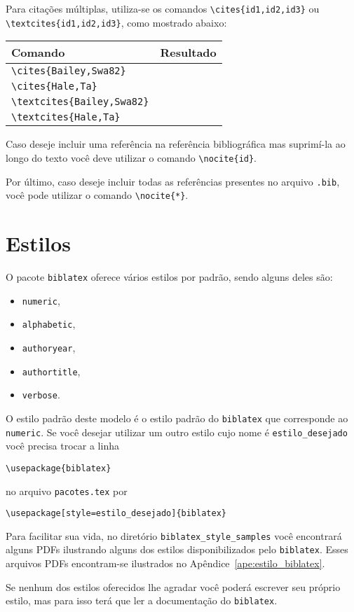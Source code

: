 Para citações múltiplas, utiliza-se os comandos \lstinline+\cites{id1,id2,id3}+
ou \lstinline+\textcites{id1,id2,id3}+, como mostrado abaixo:
\begin{table}[!h]
  \centering
  \begin{tabular}{lc}
    \toprule
    Comando & Resultado \\ \midrule
    \lstinline+\cites{Bailey,Swa82}+ & \cites{Bailey,Swa82} \\
    \lstinline+\cites{Hale,Ta}+ & \cites{Hale,Ta} \\
    \lstinline+\textcites{Bailey,Swa82}+ & \textcites{Bailey,Swa82} \\
    \lstinline+\textcites{Hale,Ta}+ & \textcites{Hale,Ta} \\ \bottomrule
  \end{tabular}
\end{table}

Caso deseje incluir uma referência na referência bibliográfica mas
suprimí-la ao longo do texto você deve utilizar o comando
\lstinline+\nocite{id}+.

Por último, caso deseje incluir todas as referências presentes no arquivo
\lstinline+.bib+, você pode utilizar o comando \lstinline+\nocite{*}+.\nocite{*}

\section{Estilos}
O pacote \lstinline+biblatex+ oferece vários estilos por padrão, sendo alguns
deles são:
\begin{itemize}
  \item \lstinline+numeric+,
  \item \lstinline+alphabetic+,
  \item \lstinline+authoryear+,
  \item \lstinline+authortitle+,
  \item \lstinline+verbose+.
\end{itemize}

O estilo padrão deste modelo é o estilo padrão do \lstinline+biblatex+ que
corresponde ao \lstinline+numeric+. Se você desejar utilizar um outro estilo
cujo nome é \lstinline+estilo_desejado+ você precisa trocar a linha
\begin{lstlisting}
\usepackage{biblatex}
\end{lstlisting}
no arquivo \lstinline+pacotes.tex+ por
\begin{lstlisting}
\usepackage[style=estilo_desejado]{biblatex}
\end{lstlisting}

Para facilitar sua vida, no diretório \lstinline+biblatex_style_samples+ você
encontrará alguns PDFs ilustrando alguns dos estilos disponibilizados pelo
\lstinline+biblatex+. Esses arquivos PDFs encontram-se ilustrados no
Apêndice~\ref{ape:estilo_biblatex}.

Se nenhum dos estilos oferecidos lhe agradar você poderá escrever seu próprio
estilo, mas para isso terá que ler a documentação do \lstinline+biblatex+.
